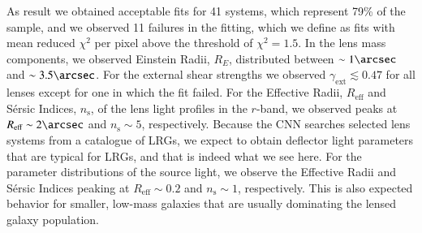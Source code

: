 \documentclass[tradiabstract,twocolumn]{aa}
\begin{document}
As result we obtained acceptable fits for 41 systems, which represent 79\% of the sample, and we observed 11 failures in the fitting, which we define as fits with mean reduced $\chi^2$ per pixel above the threshold of $\chi^2 = 1.5$. 
In the lens mass components, we observed Einstein Radii, $R_E$, distributed between $\sim1\arcsec$ and $\sim3.5\arcsec$. For the external shear strengths we observed $\gamma_{\text{ext}} \lesssim 0.47$ for all lenses except for one in which the fit failed. For the Effective Radii, $R_{\text{eff}}$ and S\'ersic Indices, $n_{\text{s}}$, of the lens light profiles in the $r$-band, we observed peaks at $R_{\text{eff}} \sim 2\arcsec$ and $n_{\text{s}} \sim 5$, respectively. Because the CNN searches selected lens systems from a catalogue of LRGs, we expect to obtain deflector light parameters that are typical for LRGs, and that is indeed what we see here. For the parameter distributions of the source light, we observe the Effective Radii and S\'ersic Indices peaking at $R_{\text{eff}} \sim 0.2$ and $n_{\text{s}} \sim 1$, respectively. This is also expected behavior for smaller, low-mass galaxies that are usually dominating the lensed galaxy population.
\end{document}
